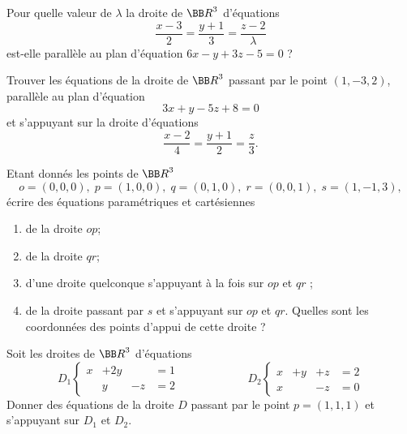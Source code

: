 \documentclass[12pt,french,oneside,a4paper]{memoir} %
\begin{document}
\begin{exo}
Pour quelle valeur de $\lambda$ la droite de ${\BB R}^3$ d'équations 
\begin{equation*}
\frac{x-3}{2} = \frac{y+1}{3} = \frac{z-2}{\lambda}
\end{equation*}
est-elle parallèle au plan d'équation $6x-y+3z-5=0$ ?
\end{exo}
\begin{exo}
Trouver les équations de la droite de ${\BB R}^3$ passant par le point $(1,-3,2)$, 
parallèle au plan d'équation
\begin{equation*}
3x+y-5z+8=0
\end{equation*}
et s'appuyant sur la droite d'équations
\begin{equation*}
\frac{x-2}{4} = \frac{y+1}{2} = \frac{z}{3}.
\end{equation*}
\end{exo}
\begin{exo}
Etant donnés les points de ${\BB R}^3$
\begin{equation*}
o=(0,0,0), \; p=(1,0,0), \; q=(0,1,0), \; r=(0,0,1), \; s=(1,-1,3),
\end{equation*}
écrire des équations paramétriques et cartésiennes
\begin{enumerate}
\item de la droite $op$;
\item de la droite $qr$; 
\item d'une droite quelconque s'appuyant à la fois sur $op$ et $qr$ ;
\item de la droite passant par $s$ et s'appuyant sur $op$ et $qr$. 
Quelles sont les coordonnées des points d'appui de cette droite ?
\end{enumerate}
\end{exo}
\begin{exo}
Soit les droites de ${\BB R}^3$ d'équations
\begin{equation*}
D_1 \left\{ \begin{array}{rrrl}
x &+2y &&=1 \\
&y &-z &=2
\end{array} \right. 
\qquad \qquad \qquad D_2 \left\{ \begin{array}{rrrl}
x &+y &+z &=2 \\
x & &-z &=0
\end{array} \right.
\end{equation*}
Donner des équations de la droite $D$ passant par le point $p=(1,1,1)$ et 
s'appuyant sur $D_1$ et $D_2$.
\end{exo}
\end{document}
